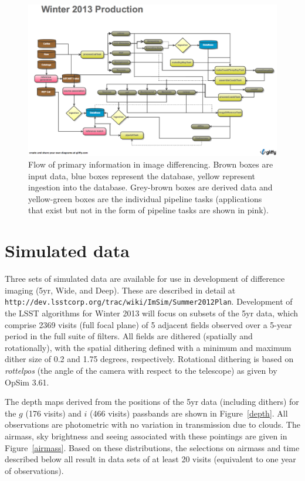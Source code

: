 \documentclass[prd, nofootinbib, floatfix, 11pt,tightenlines,times]{article}
\begin{document}
\begin{figure}
\includegraphics[width=\textwidth]{Figures/Winter_2013.eps}
\caption{Flow of primary information in image differencing. Brown
  boxes are input data, blue boxes represent the database, yellow
  represent ingestion into the database. Grey-brown boxes are derived
  data and yellow-green boxes are the individual pipeline tasks (applications
  that exist but not in the form of pipeline tasks are shown in pink).}
\label{flow}
\end{figure}

\clearpage 

\section{Simulated data} 

Three sets of simulated data are available for use in development of
difference imaging (5yr, Wide, and Deep). These are described in
detail at {\tt
  http://dev.lsstcorp.org/trac/wiki/ImSim/Summer2012Plan}.
Development of the LSST algorithms for Winter 2013 will focus on
subsets of the 5yr data, which comprise 2369 visits (full focal plane)
of 5 adjacent fields observed over a 5-year period in the full suite
of filters. All fields are dithered (spatially and rotationally), with the
spatial dithering defined with a minimum and maximum dither size of
0.2 and 1.75 degrees, respectively. Rotational dithering is based on
{\it rottelpos} (the angle of the camera with respect to the
telescope) as given by OpSim 3.61.

The depth maps derived from the positions of the 5yr data (including
dithers) for the $g$ (176 visits) and $i$ (466 visits) passbands are
shown in Figure~\ref{depth}. All observations are photometric with no
variation in transmission due to clouds. The airmass, sky brightness
and seeing associated with these pointings are given in
Figure~\ref{airmass}. Based on these distributions, the selections on
airmass and time described below all result in data sets of at least
20 visits (equivalent to one year of observations).
\end{document}
